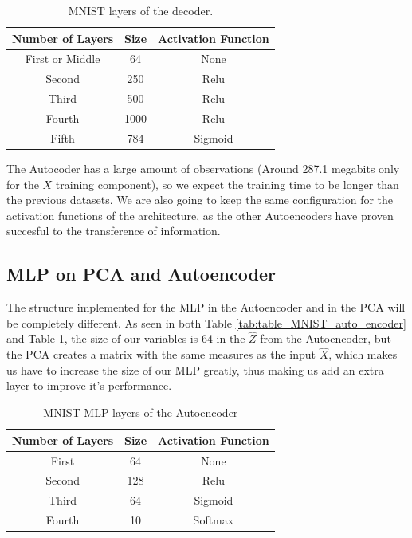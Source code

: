\begin{table}[H]
	\caption{MNIST layers of the decoder.}
	\begin{center}
		\label{tab:table_MNIST_auto_decoder}
		\begin{tabular}{c|c|c} %
			\textbf{Number of Layers} & \textbf{Size} & \textbf{Activation Function} \\
			\hline
			First or Middle & 64 & None\\
			Second & 250 & Relu\\
			Third & 500  & Relu\\
			Fourth & 1000 & Relu\\
			Fifth & 784 & Sigmoid \\
		\end{tabular}
	\end{center}
\end{table}

The Autocoder has a large amount of observations (Around 287.1 megabits only for the $X$ training component), so we expect the training time to be longer than the previous datasets. We are also going to keep the same configuration for the activation functions of the architecture, as the other Autoencoders  have proven succesful to the transference of information.

\subsection{MLP on PCA and Autoencoder}

The structure implemented for the MLP in the Autoencoder and in the PCA will be completely different. As seen in both Table \ref{tab:table_MNIST_auto_encoder} and Table \ref{tab:table_MNIST_auto_decoder}, the size of our variables is 64 in the $\hat{Z}$ from the Autoencoder, but the PCA creates a matrix with the same measures as the input $\hat{X}$, which makes us have to increase the size of our MLP greatly, thus making us add an extra layer to improve it's performance.
\par	

\begin{table}[H]
	\caption{MNIST MLP layers of the Autoencoder}
	\begin{center}
		\label{tab:table_MNIST_MLP_auto}
		\begin{tabular}{c|c|c} %
			\textbf{Number of Layers} & \textbf{Size} & \textbf{Activation Function} \\
			\hline
			First & 64 & None\\
			Second & 128 & Relu\\
			Third & 64  & Sigmoid\\
			Fourth & 10 & Softmax\\
		\end{tabular}
	\end{center}
\end{table}

